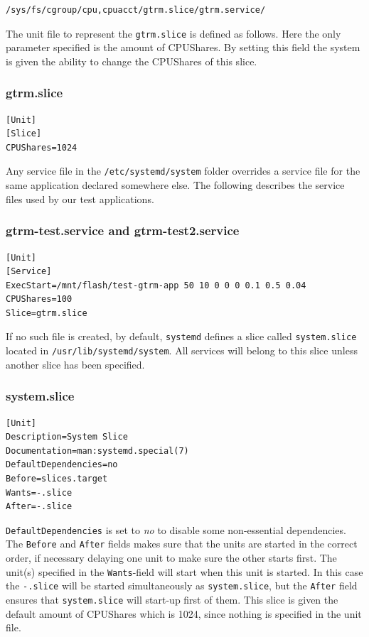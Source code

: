 \documentclass[nobiblatex]{LTHthesis}
\begin{document}
\begin{verbatim}
/sys/fs/cgroup/cpu,cpuacct/gtrm.slice/gtrm.service/
\end{verbatim}

The unit file to represent the \texttt{gtrm.slice} is defined as follows. Here the only parameter specified is the amount of CPUShares. By setting this field the system is given the ability to change the CPUShares of this slice.
\subsubsection{gtrm.slice}
\begin{verbatim}
[Unit]
[Slice]
CPUShares=1024
\end{verbatim}

Any service file in the \texttt{/etc/systemd/system} folder overrides a service file for the same application declared somewhere else. The following describes the service files used by our test applications.

\subsubsection{gtrm-test.service and gtrm-test2.service}
\begin{verbatim}
[Unit]
[Service]
ExecStart=/mnt/flash/test-gtrm-app 50 10 0 0 0 0.1 0.5 0.04
CPUShares=100
Slice=gtrm.slice
\end{verbatim}

If no such file is created, by default, \texttt{systemd} defines a slice called \texttt{system.slice} located in \texttt{/usr/lib/systemd/system}. All services will belong to this slice unless another slice has been specified. 
\subsubsection{system.slice}
\begin{verbatim}
[Unit]
Description=System Slice
Documentation=man:systemd.special(7)
DefaultDependencies=no
Before=slices.target
Wants=-.slice
After=-.slice
\end{verbatim}

\texttt{DefaultDependencies} is set to \emph{no} to disable some non-essential dependencies. The \texttt{Before} and \texttt{After} fields makes sure that the units are started in the correct order, if necessary delaying one unit to make sure the other starts first. The unit(s) specified in the \texttt{Wants}-field will start when this unit is started. In this case the \texttt{-.slice} will be started simultaneously as \texttt{system.slice}, but the \texttt{After} field ensures that \texttt{system.slice} will start-up first of them. This slice is given the default amount of CPUShares which is 1024, since nothing is specified in the unit file.
\end{document}
